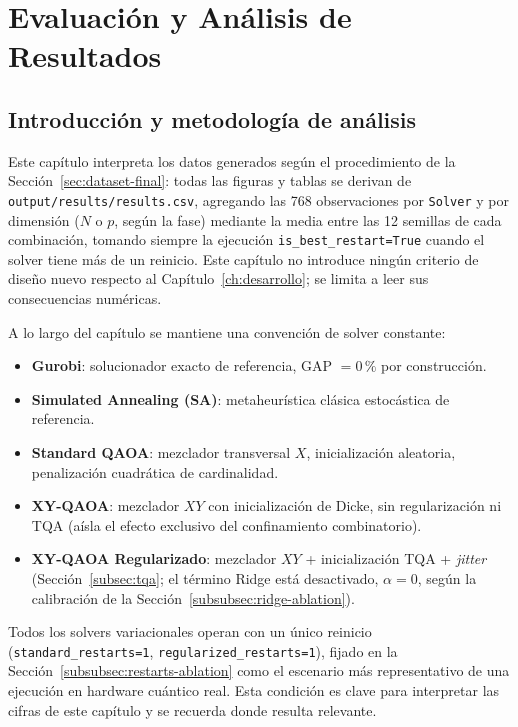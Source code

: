 \chapter{Evaluación y Análisis de Resultados}
\label{ch:resultados}

\section{Introducción y metodología de análisis}
\label{sec:intro-analisis}

Este capítulo interpreta los datos generados según el procedimiento de la Sección~\ref{sec:dataset-final}: todas las figuras y tablas se derivan de \texttt{output/results/results.csv}, agregando las 768 observaciones por \texttt{Solver} y por dimensión ($N$ o $p$, según la fase) mediante la media entre las 12 semillas de cada combinación, tomando siempre la ejecución \texttt{is\_best\_restart=True} cuando el solver tiene más de un reinicio. Este capítulo no introduce ningún criterio de diseño nuevo respecto al Capítulo~\ref{ch:desarrollo}; se limita a leer sus consecuencias numéricas.

A lo largo del capítulo se mantiene una convención de solver constante:

\begin{itemize}
    \item \textbf{Gurobi}: solucionador exacto de referencia, GAP $=0\,\%$ por construcción.
    \item \textbf{Simulated Annealing (SA)}: metaheurística clásica estocástica de referencia.
    \item \textbf{Standard QAOA}: mezclador transversal $X$, inicialización aleatoria, penalización cuadrática de cardinalidad.
    \item \textbf{XY-QAOA}: mezclador $XY$ con inicialización de Dicke, sin regularización ni TQA (aísla el efecto exclusivo del confinamiento combinatorio).
    \item \textbf{XY-QAOA Regularizado}: mezclador $XY$ + inicialización TQA + \textit{jitter} (Sección~\ref{subsec:tqa}; el término Ridge está desactivado, $\alpha=0$, según la calibración de la Sección~\ref{subsubsec:ridge-ablation}).
\end{itemize}

Todos los solvers variacionales operan con un único reinicio (\texttt{standard\_restarts=1}, \texttt{regularized\_restarts=1}), fijado en la Sección~\ref{subsubsec:restarts-ablation} como el escenario más representativo de una ejecución en hardware cuántico real. Esta condición es clave para interpretar las cifras de este capítulo y se recuerda donde resulta relevante.

